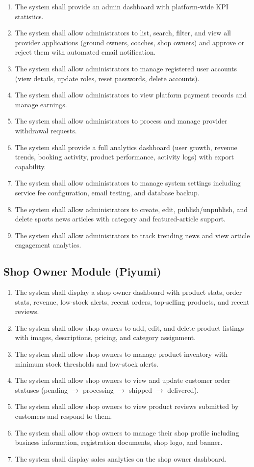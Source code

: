 \documentclass[12pt,a4paper]{report}
\begin{document}
\begin{enumerate}[leftmargin=1.5cm]
  \item The system shall provide an admin dashboard with platform-wide KPI statistics.
  \item The system shall allow administrators to list, search, filter, and view all provider applications (ground owners, coaches, shop owners) and approve or reject them with automated email notification.
  \item The system shall allow administrators to manage registered user accounts (view details, update roles, reset passwords, delete accounts).
  \item The system shall allow administrators to view platform payment records and manage earnings.
  \item The system shall allow administrators to process and manage provider withdrawal requests.
  \item The system shall provide a full analytics dashboard (user growth, revenue trends, booking activity, product performance, activity logs) with export capability.
  \item The system shall allow administrators to manage system settings including service fee configuration, email testing, and database backup.
  \item The system shall allow administrators to create, edit, publish/unpublish, and delete sports news articles with category and featured-article support.
  \item The system shall allow administrators to track trending news and view article engagement analytics.
\end{enumerate}

\subsection{Shop Owner Module (Piyumi)}

\begin{enumerate}[leftmargin=1.5cm]
  \item The system shall display a shop owner dashboard with product stats, order stats, revenue, low-stock alerts, recent orders, top-selling products, and recent reviews.
  \item The system shall allow shop owners to add, edit, and delete product listings with images, descriptions, pricing, and category assignment.
  \item The system shall allow shop owners to manage product inventory with minimum stock thresholds and low-stock alerts.
  \item The system shall allow shop owners to view and update customer order statuses (pending $\to$ processing $\to$ shipped $\to$ delivered).
  \item The system shall allow shop owners to view product reviews submitted by customers and respond to them.
  \item The system shall allow shop owners to manage their shop profile including business information, registration documents, shop logo, and banner.
  \item The system shall display sales analytics on the shop owner dashboard.
\end{enumerate}
\end{document}
